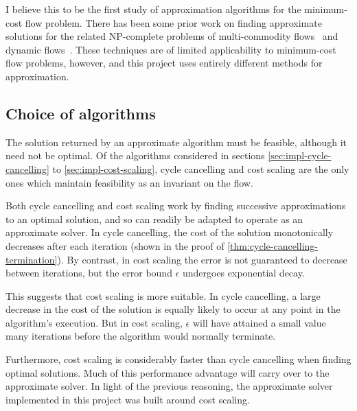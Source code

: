I believe this to be the first study of approximation algorithms for the minimum-cost flow problem. There has been some prior work on finding approximate solutions for the related NP-complete problems of multi-commodity flows~\cite{Garg:2007} and dynamic flows~\cite{Hoppe:1994}. These techniques are of limited applicability to minimum-cost flow problems\footnotemark, however, and this project uses entirely different methods for approximation.

\subsection{Choice of algorithms} \label{sec:impl-approx-choice}

The solution returned by an approximate algorithm must be feasible, although it need not be optimal. Of the algorithms considered in sections \ref{sec:impl-cycle-cancelling} to \ref{sec:impl-cost-scaling}, cycle cancelling and cost scaling are the only ones which maintain feasibility as an invariant on the flow\footnotemark.

Both cycle cancelling and cost scaling work by finding successive approximations to an optimal solution, and so can readily be adapted to operate as an approximate solver. In cycle cancelling, the cost of the solution monotonically decreases after each iteration (shown in the proof of \cref{thm:cycle-cancelling-termination}). By contrast, in cost scaling the error is not guaranteed to decrease between iterations, but the error bound $\epsilon$ undergoes exponential decay.

This suggests that cost scaling is more suitable. In cycle cancelling, a large decrease in the cost of the solution is equally likely to occur at any point in the algorithm's execution. But in cost scaling, $\epsilon$ will have attained a small value many iterations before the algorithm would normally terminate. 

Furthermore, cost scaling is considerably faster than cycle cancelling when finding optimal solutions. Much of this performance advantage will carry over to the approximate solver. In light of the previous reasoning, the approximate solver implemented in this project was built around cost scaling.

